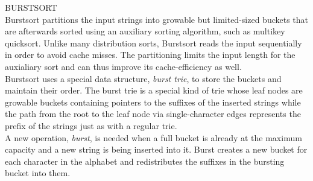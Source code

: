 {\sffamily\normalsize{\color{sciorange} BURSTSORT}}\vspace{1mm}\\
\footnotesize 
Burstsort partitions the input strings into growable but limited-sized
buckets that are afterwards sorted using an auxiliary sorting
algorithm, such as multikey quicksort. Unlike many distribution sorts,
Burstsort reads the input sequentially in order to avoid cache misses.
The partitioning limits the input length for the auxialiary sort and
can thus improve its cache-efficiency as well.\\

Burstsort uses a special data structure, \emph{burst trie}, to store
the buckets and maintain their order. The burst trie is a special kind
of trie whose leaf nodes are growable buckets containing pointers to
the suffixes of the inserted strings while the path from the root to
the leaf node via single-character edges represents the prefix of the
strings just as with a regular trie.\\

A new operation, \emph{burst}, is needed when a full bucket is already
at the maximum capacity and a new string is being inserted into
it. Burst creates a new bucket for each character in the alphabet and
redistributes the suffixes in the bursting bucket into them.\\


